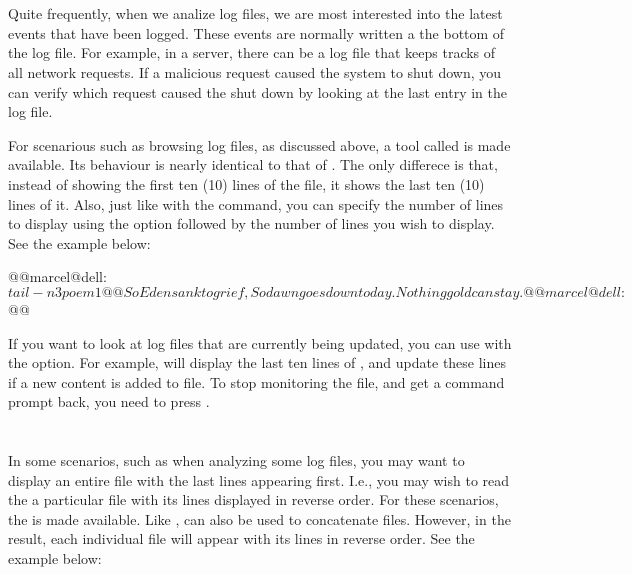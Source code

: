 \section{}
 Quite frequently, when we analize log files, we are most interested into the latest events that have been logged. These events are normally written a the bottom of the log file. For example, in a server, there can be a log file that keeps tracks of all network requests. If a malicious request caused the system to shut down, you can verify which request caused the shut down by looking at the last entry in the log file.

 For scenarious such as browsing log files, as discussed above, a tool called  is made available. Its behaviour is nearly identical to that of . The only differece is that, instead of showing the first ten (10) lines of the file, it shows the last ten (10) lines of it. Also, just like with the  command, you can specify the number of lines to display using the  option followed by the number of lines you wish to display. See the example below:

 \begin{command_line}[Bash]
@@marcel@dell:~$ tail -n 3 poem1@@
So Eden sank to grief,
So dawn goes down to day.
Nothing gold can stay.
@@marcel@dell:~$ @@
\end{command_line}

If you want to look at log files that are currently being updated, you can use  with the  option. For example,  will display the last ten lines of , and update these lines if a new content is added to file. To stop monitoring the file, and get a command prompt back, you need to press .

\section{}

In some scenarios, such as when analyzing some log files, you may want to display an entire file with the last lines appearing first. I.e., you may wish to read the a particular file with its lines displayed in reverse order. For these scenarios, the  is made available. Like ,  can also be used to concatenate files. However, in the result, each individual file will appear with its lines in reverse order. See the example below:

